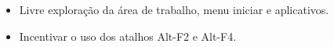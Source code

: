 \begin{itemize}
	\item Livre exploração da área de trabalho, menu iniciar e aplicativos.
	\item Incentivar o uso dos atalhos Alt-F2 e Alt-F4.
\end{itemize}
